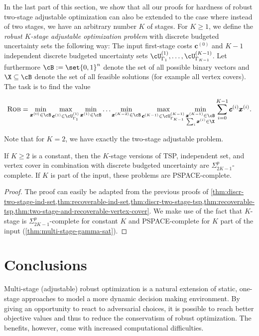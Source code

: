 \documentclass[a4paper,abstracton]{scrartcl}
\begin{document}
In the last part of this section, we show that all our proofs for hardness of robust two-stage adjustable optimization can also be extended to the case where instead of two stages, we have an arbitrary number $K$ of stages. For $K \geq 1$, we define the \emph{robust $K$-stage adjustable optimization problem} with discrete budgeted uncertainty sets the following way: The input  first-stage costs $\pmb c^{(0)}$ and $K-1$ independent discrete budgeted uncertainty sets $\cU^{(1)}_{\Gamma_1},\dots,\cU^{(K-1)}_{\Gamma_{K-1}}$. Let furthermore $\cB := \set{0,1}^n$ denote the set of all possible binary vectors and $\X \subseteq \cB$ denote the set of all feasible solutions (for example all vertex covers).
The task is to find the value

\begin{equation*}
\textsc{Rob} = \min_{\pmb x^{(0)} \in \cB} \max_{\pmb c^{(1)} \in \cU^{(1)}_{\Gamma_1} } \min_{\pmb x^{(1)} \in \cB} \dots \min_{\pmb x^{(K-2)} \in \cB} \max_{\pmb c^{(K-1)} \in \cU^{(K-1)}_{\Gamma_{K-1}}} \min_{\substack{\pmb x^{(K-1)} \in \cB\\ \sum_i \pmb x^{(i)} \in \X}} \sum_{i=0}^{K-1} \pmb c^{(i)}\pmb x^{(i)}.
\end{equation*} 

Note that for $K=2$, we have exactly the two-stage adjustable problem. 
\begin{theorem}
If $K \geq 2$ is a constant, then the $K$-stage versions of TSP, independent set, and vertex cover in combination with discrete budgeted uncertainty are $\Sigma_{2K-1}^p$-complete. If $K$ is part of the input, these problems are PSPACE-complete.
\end{theorem}
\begin{proof}
The proof can easily be adapted from the previous proofs of \cref{thm:discr-two-stage-ind-set,thm:recoverable-ind-set,thm:discr-two-stage-tsp,thm:recoverable-tsp,thm:two-stage-and-recoverable-vertex-cover}.
We make use of the fact that $K$-stage {\radj} is $\Sigma_{2K-1}^p$-complete for constant $K$ and PSPACE-complete for $K$ part of the input (\cref{thm:multi-stage-gamma-sat}). 
\end{proof}




\section{Conclusions}
\label{sec:conclusions}

Multi-stage (adjustable) robust optimization is a natural extension of static, one-stage approaches to model a more dynamic decision making environment. By giving an opportunity to react to adversarial choices, it is possible to reach better objective values and thus to reduce the conservatism of robust optimization. The benefits, however, come with increased computational difficulties.
\end{document}
